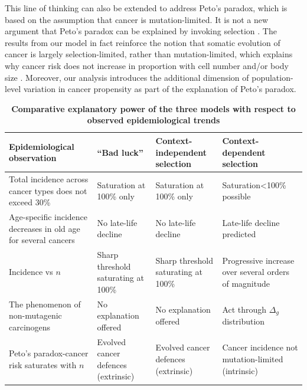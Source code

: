 \documentclass[12pt,onecolumn,twoside]{article}
\begin{document}
This line of thinking can also be extended to address Peto's paradox, which is based on the assumption that cancer is mutation-limited. It is not a new argument that Peto's paradox can be explained by invoking selection \autocite{Caulin2011,Noble2015,Tollis2017b}. The results from our model in fact reinforce the notion that somatic evolution of cancer is largely selection-limited, rather than mutation-limited, which explains why cancer risk does not increase in proportion with cell number and/or body size \autocite{Nagy2007}. Moreover, our analysis introduces the additional dimension of population-level variation in cancer propensity as part of the explanation of Peto's paradox.

\begin{table}[h]
	\centering
	\caption{\textbf{Comparative explanatory power of the three models with respect to observed epidemiological trends}}
	\vspace{5pt}
	\begin{tabular}{p{3.5cm}p{3.4cm}p{3.5cm}p{3.5cm}}
	Epidemiological observation & ``Bad luck'' & Context-independent selection & Context-dependent selection \\
	\hline
	Total incidence across cancer types does not exceed 30\% & Saturation at 100\% only & Saturation at 100\% only & Saturation<100\% possible \\
	Age-specific incidence decreases in old age for several cancers & No late-life decline & No late-life decline & Late-life decline predicted \\
	Incidence vs $n$ & Sharp threshold saturating at 100\% & Sharp threshold saturating at 100\% & Progressive increase over several orders of magnitude \\
	The phenomenon of non-mutagenic carcinogens & No explanation offered & No explanation offered & Act through $\Delta_{g}$ distribution \\
	Peto's paradox-cancer risk saturates with $n$ & Evolved cancer defences (extrinsic) & Evolved cancer defences (extrinsic) & Cancer incidence not mutation-limited (intrinsic) \\
	\hline
	\end{tabular}
	\label{Table 1}
\end{table}
\end{document}
